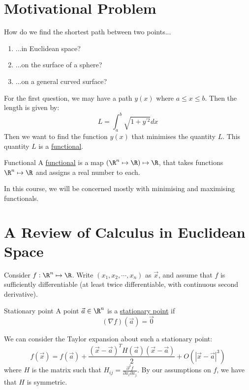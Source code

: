 \documentclass[../Main.tex]{subfiles}
\begin{document}
\section{Motivational Problem}
How do we find the shortest path between two points...
\begin{enumerate}
    \item ...in Euclidean space?
    \item ...on the surface of a sphere?
    \item ...on a general curved surface?
\end{enumerate}
For the first question, we may have a path $y(x)$ where $a \leq x \leq b$. Then the length is given by:
\begin{equation*}
    L = \int_a^b \sqrt{1 + y^{\prime 2}}dx
\end{equation*}
Then we want to find the function $y(x)$ that minimises the quantity $L$. This quantity $L$ is a \underline{functional}.
\begin{definition}{Functional}
    A \underline{functional} is a map $(\R^n \mapsto \R) \mapsto \R$, that takes functions $\R^n \mapsto \R$ and assigns a real number to each.
\end{definition}
In this course, we will be concerned mostly with minimising and maximising functionals.
\section{A Review of Calculus in Euclidean Space}
Consider $f : \R^n \mapsto \R$. Write $(x_1, x_2, \cdots, x_n)$ as $\vec{x}$, and assume that $f$ is sufficiently differentiable (at least twice differentiable, with continuous second derivative).
\begin{definition}{Stationary point}
    A point $\vec{a} \in \R^n$ is a \underline{stationary point} if
    \begin{equation*}
        (\nabla f)(\vec{a}) = \vec{0}
    \end{equation*}
\end{definition}
We can consider the Taylor expansion about such a stationary point:
\begin{equation*}
    f(\vec{x}) = f(\vec{a}) + \frac{(\vec{x} - \vec{a})^T H(\vec{a}) (\vec{x} - \vec{a})}{2} + O(|\vec{x} - \vec{a}|^3)
\end{equation*}
where $H$ is the matrix such that $H_{ij} = \frac{\partial^2f}{\partial x_i \partial x_j}$. By our assumptions on $f$, we have that $H$ is symmetric.
\end{document}
